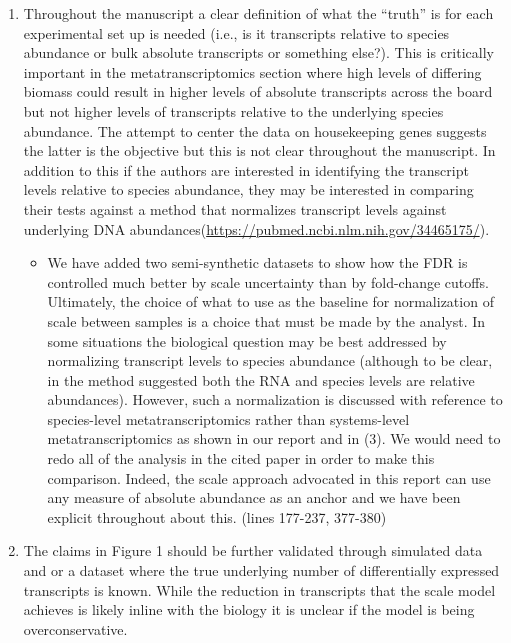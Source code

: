 \documentclass[
]{article}
\providecommand{\tightlist}{%
  \setlength{\itemsep}{0pt}\setlength{\parskip}{0pt}}
\begin{document}
\begin{enumerate}
\def\labelenumi{\arabic{enumi}.}
\item
  Throughout the manuscript a clear definition of what the ``truth'' is
  for each experimental set up is needed (i.e., is it transcripts
  relative to species abundance or bulk absolute transcripts or
  something else?). This is critically important in the
  metatranscriptomics section where high levels of differing biomass
  could result in higher levels of absolute transcripts across the board
  but not higher levels of transcripts relative to the underlying
  species abundance. The attempt to center the data on housekeeping
  genes suggests the latter is the objective but this is not clear
  throughout the manuscript. In addition to this if the authors are
  interested in identifying the transcript levels relative to species
  abundance, they may be interested in comparing their tests against a
  method that normalizes transcript levels against underlying DNA
  abundances(\url{https://pubmed.ncbi.nlm.nih.gov/34465175/}).

  \begin{itemize}
  \tightlist
  \item
    We have added two semi-synthetic datasets to show how the FDR is
    controlled much better by scale uncertainty than by fold-change
    cutoffs. Ultimately, the choice of what to use as the baseline for
    normalization of scale between samples is a choice that must be made
    by the analyst. In some situations the biological question may be
    best addressed by normalizing transcript levels to species abundance
    (although to be clear, in the method suggested both the RNA and
    species levels are relative abundances). However, such a
    normalization is discussed with reference to species-level
    metatranscriptomics rather than systems-level metatranscriptomics as
    shown in our report and in (3). We would need to redo all of the
    analysis in the cited paper in order to make this comparison.
    Indeed, the scale approach advocated in this report can use any
    measure of absolute abundance as an anchor and we have been explicit
    throughout about this. (lines 177-237, 377-380)
  \end{itemize}
\item
  The claims in Figure 1 should be further validated through simulated
  data and or a dataset where the true underlying number of
  differentially expressed transcripts is known. While the reduction in
  transcripts that the scale model achieves is likely inline with the
  biology it is unclear if the model is being overconservative.


\end{enumerate}
\end{document}
